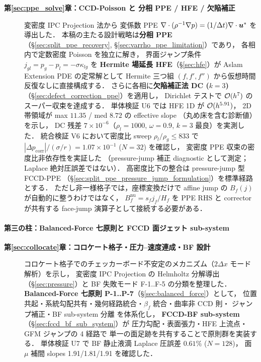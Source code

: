 \begin{description}
  \item[\textbf{第\ref{sec:ppe_solve}章：CCD-Poisson と 分相 PPE / HFE / 欠陥補正}]
        変密度 IPC Projection 法から
        変係数 PPE $\nabla\cdot(\rho^{-1}\nabla p)=(1/\Delta t)\nabla\cdot\bm{u}^*$ を導出した．
        本稿の主たる設計戦略は\textbf{分相 PPE}（§\ref{sec:split_ppe_recovery},
        §\ref{sec:varrho_ppe_limitation}）であり，
        各相内で定数密度 Poisson を独立に解き，
        界面ジャンプ条件 $j_{gl}=p_g-p_l=-\sigma\kappa_{lg}$ を
        \textbf{Hermite 場延長 HFE}（§\ref{sec:hfe}）が
        Aslam Extension PDE の定常解として
        Hermite 三つ組 $(f,f',f'')$ から仮想時間反復なしに直接構成する．
        さらに各相に\textbf{欠陥補正法 DC ($k=3$)}（§\ref{sec:defect_correction_ppe}）を適用し，
        Dirichlet テストで $\mathcal{O}(h^7)$ のスーパー収束を達成する．
        単体検証 U6 では HFE 1D が $\mathcal{O}(h^{5.91})$，
        2D 帯領域が max $11.35$ / med $8.72$ の effective slope
        （丸め床を含む診断値）を示し，
        DC 残差 $7\times10^{-6}$（$\rho_l=1000$, $\omega=0.9$, $k=3$ 最良）を実測した．
        統合検証 V6 において密度比 sweep $\rho_l/\rho_g\le833$ で
        $|\Delta p_{\mathrm{corr}}|/(\sigma/r)=1.07\times10^{-1}$ ($N=32$) を確認し，
        変密度 PPE 収束の密度比非依存性を実証した
        （pressure-jump 補正 diagnostic として測定；Laplace 絶対圧誤差ではない）．
        高密度比下の整合は pressure-jump 型 FCCD-PPE
        （§\ref{sec:split_ppe_pressure_jump_formulation}）を標準経路とする．
        ただし非一様格子では，座標変換だけで affine jump の
        $B_f(j)$ が自動的に整うわけではなく，
        $B_f^{\mathrm{nu}}=s_fj_f/H_f$ を PPE RHS と corrector が共有する
        face-jump 演算子として接続する必要がある．
\end{description}

\paragraph{第三の柱：Balanced-Force 七原則と FCCD 面ジェット sub-system}\hfill\null

\begin{description}
  \item[\textbf{第\ref{sec:collocate}章：コロケート格子・圧力--速度連成・BF 設計}]
        コロケート格子でのチェッカーボード不安定のメカニズム（$2\Delta x$ モード解析）を示し，
        変密度 IPC Projection の Helmholtz 分解導出（§\ref{sec:pressure}）と
        BF 失敗モード F-1..F-5 の分類を整理した．
        \textbf{Balanced-Force 七原則 P-1..P-7}（§\ref{sec:balanced_force}）として，
        位置共起・系統勾配共有・幾何経路統合・$\beta_f$ 統合・曲率非 CCD 則・
        ジャンプ補正・BF sub-system 分離 を体系化し，
        \textbf{FCCD-BF sub-system}（§\ref{sec:fccd_bf_sub_system}）が
        圧力勾配・表面張力・HFE 上流点・GFM ジャンプの 4 経路で
        単一の面足跡を共有することで原則群を実装する．
        単体検証 U7 で BF 静止液滴 Laplace 圧誤差 $0.61\%$ ($N=128$)，
        面 $\mu$ 補間 slopes 1.91/1.81/1.91 を確認した．
\end{description}

